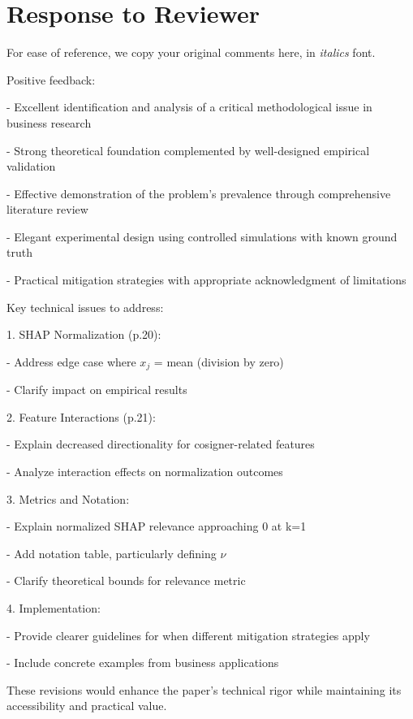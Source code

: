 \documentclass[11pt]{article}
\newcounter{se}[section]
\newcounter{reviewer}
\newcounter{point}[reviewer]
\renewcommand{\thepoint}{R\,\thereviewer.\arabic{point}}
\newcommand{\reviewersection}{\stepcounter{reviewer} \newpage
 \section*{Response to Reviewer \thereviewer}}
\newenvironment{point*}{\bigskip \noindent \rmfamily \itshape}{\medskip} %
\newcommand{\shortpoint}[1]{\refstepcounter{point} \bigskip \noindent
{\textbf{\thepoint}} ---~#1\par }
\newcommand{\shortreply}[2][]{%
    \medskip \noindent
    \begin{sf}\textbf{Reply}:\ #2
        \ifthenelse{\equal{#1}{}}{}{ \hfill \footnotesize (#1)}%
        \medskip
    \end{sf}
}
\begin{document}

\newpage{}

\reviewersection{}
\textsf{For ease of reference, we copy your original comments here, in \emph{italics} font.}

\begin{point*}
Positive feedback:

- Excellent identification and analysis of a critical methodological issue in business research

- Strong theoretical foundation complemented by well-designed empirical validation

- Effective demonstration of the problem's prevalence through comprehensive literature review

- Elegant experimental design using controlled simulations with known ground truth

- Practical mitigation strategies with appropriate acknowledgment of limitations

Key technical issues to address:

1. SHAP Normalization (p.20):

  - Address edge case where $x_j$ = mean (division by zero)
  
  - Clarify impact on empirical results

2. Feature Interactions (p.21):
  
  - Explain decreased directionality for cosigner-related features
  
  - Analyze interaction effects on normalization outcomes

3. Metrics and Notation:
  
  - Explain normalized SHAP relevance approaching 0 at k=1
  
  - Add notation table, particularly defining $\nu$
  
  - Clarify theoretical bounds for relevance metric

4. Implementation:
  
  - Provide clearer guidelines for when different mitigation strategies apply
  
  - Include concrete examples from business applications

These revisions would enhance the paper's technical rigor while maintaining its accessibility and practical value.



\end{point*}
\end{document}
